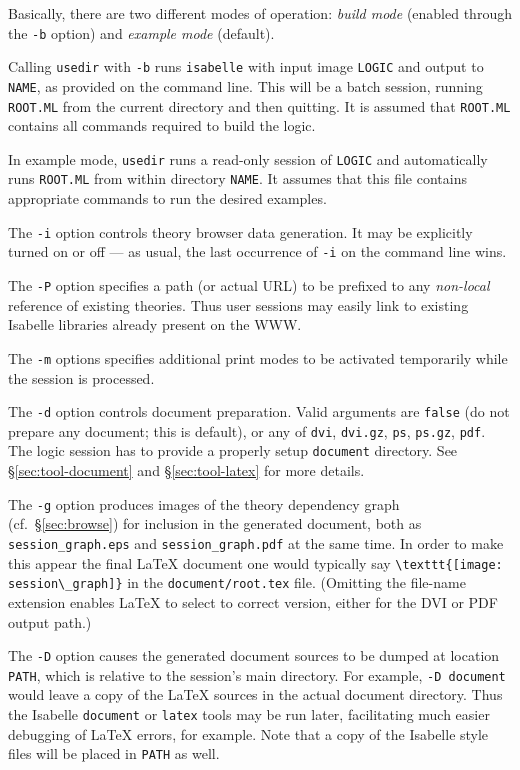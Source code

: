 Basically, there are two different modes of operation: \emph{build mode}
(enabled through the \texttt{-b} option) and \emph{example mode} (default).

Calling \texttt{usedir} with \texttt{-b} runs \texttt{isabelle} with input
image \texttt{LOGIC} and output to \texttt{NAME}, as provided on the command
line. This will be a batch session, running \texttt{ROOT.ML} from the current
directory and then quitting.  It is assumed that \texttt{ROOT.ML} contains all
{\ML} commands required to build the logic.

In example mode, \texttt{usedir} runs a read-only session of \texttt{LOGIC}
and automatically runs \texttt{ROOT.ML} from within directory \texttt{NAME}.
It assumes that this file contains appropriate {\ML} commands to run the
desired examples.

\medskip The \texttt{-i} option controls theory browser data generation. It
may be explicitly turned on or off --- as usual, the last occurrence of
\texttt{-i} on the command line wins.

The \texttt{-P} option specifies a path (or actual URL) to be prefixed to any
\emph{non-local} reference of existing theories.  Thus user sessions may
easily link to existing Isabelle libraries already present on the WWW.

The \texttt{-m} options specifies additional print modes to be activated
temporarily while the session is processed.

\medskip The \texttt{-d} option controls document preparation.  Valid
arguments are \texttt{false} (do not prepare any document; this is default),
or any of \texttt{dvi}, \texttt{dvi.gz}, \texttt{ps}, \texttt{ps.gz},
\texttt{pdf}.  The logic session has to provide a properly setup
\texttt{document} directory.  See \S\ref{sec:tool-document} and
\S\ref{sec:tool-latex} for more details.

The \texttt{-g} option produces images of the theory dependency graph (cf.\ 
\S\ref{sec:browse}) for inclusion in the generated document, both as
\texttt{session_graph.eps} and \texttt{session_graph.pdf} at the same time.
In order to make this appear the final {\LaTeX} document one would typically
say \verb,\texttt{[image: session\_graph]}, in the \texttt{document/root.tex}
file.  (Omitting the file-name extension enables {\LaTeX} to select to correct
version, either for the DVI or PDF output path.)

\medskip The \texttt{-D} option causes the generated document sources to be
dumped at location \texttt{PATH}, which is relative to the session's main
directory.  For example, \texttt{-D document} would leave a copy of the
{\LaTeX} sources in the actual document directory.  Thus the Isabelle
\texttt{document} or \texttt{latex} tools may be run later, facilitating much
easier debugging of {\LaTeX} errors, for example.  Note that a copy of the
Isabelle style files will be placed in \texttt{PATH} as well.

